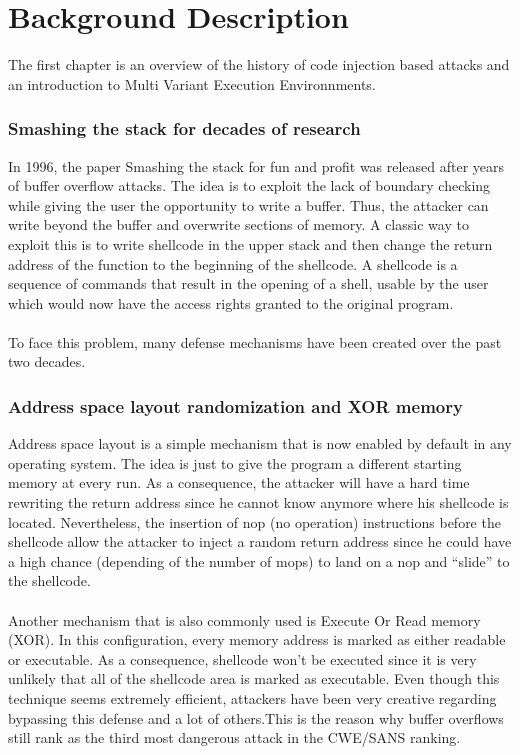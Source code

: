 \documentclass[english]{enstaPRE}
\begin{document}
\part{Background Description}
The first chapter is an overview of the history of code injection based attacks and an introduction to Multi Variant Execution Environnments.

\section{Smashing the stack for decades of research}
In 1996, the paper Smashing the stack for fun and profit \cite{smashing} was released after years of buffer overflow attacks.
The idea is to exploit the lack of boundary checking while giving the user the opportunity to write a buffer.
Thus, the attacker can write beyond the buffer and overwrite sections of memory. 
A classic way to exploit this is to write shellcode in the upper stack and then change the return address of the function
to the beginning of the shellcode. A shellcode is a sequence of commands that result in the opening of a shell, usable by the user which
would now have the access rights granted to the original program.\\
 \\

To face this problem, many defense mechanisms have been created over the past two decades.

\section{Address space layout randomization and XOR memory}
Address space layout is a simple mechanism that is now enabled by default in any operating system. The idea is just to give the 
program a different starting memory at every run. As a consequence, the attacker will have a hard time rewriting the return address since
he cannot know anymore where his shellcode is located. 
Nevertheless, the insertion of nop (no operation) instructions before the shellcode allow the attacker to inject a random 
return address since he could have a high chance (depending of the number of mops) to land on a nop and ``slide'' to the shellcode.
\\ \\
Another mechanism that is also commonly used is Execute Or Read memory (XOR). In this configuration, every memory address is marked
as either readable or executable. As a consequence, shellcode won't be executed since it is very unlikely that all of the shellcode
area is marked as executable.
Even though this technique seems extremely efficient, attackers have been very creative regarding bypassing this defense 
and a lot of others.This is the reason why buffer overflows still rank as the third most dangerous attack in the CWE/SANS ranking.\\
 \\
\end{document}
